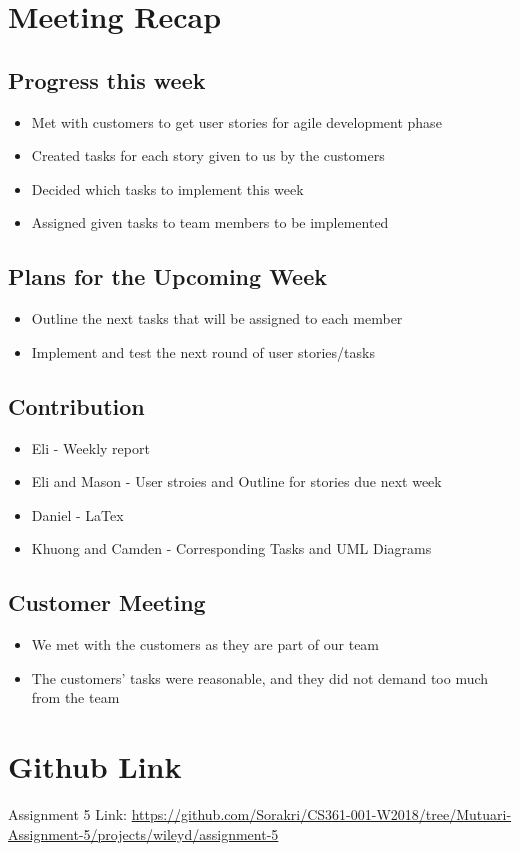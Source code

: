 \newpage
\section{Meeting Recap}
\subsection{Progress this week}
\begin{itemize}
	\item Met with customers to get user stories for agile development phase
	\item Created tasks for each story given to us by the customers
	\item Decided which tasks to implement this week
	\item Assigned given tasks to team members to be implemented
\end{itemize}

\subsection{Plans for the Upcoming Week}
\begin{itemize}
	\item Outline the next tasks that will be assigned to each member
	\item Implement and test the next round of user stories/tasks
\end{itemize}

\subsection{Contribution}
\begin{itemize}
	\item Eli - Weekly report
	\item Eli and Mason - User stroies and Outline for stories due next week
	\item Daniel - LaTex
	\item Khuong and Camden - Corresponding Tasks and UML Diagrams
\end{itemize}

\subsection{Customer Meeting}
\begin{itemize}
	\item We met with the customers as they are part of our team
	\item The customers' tasks were reasonable, and they did not demand too much from the team
\end{itemize}

\section{Github Link}
Assignment 5 Link:
\href{url}{ https://github.com/Sorakri/CS361-001-W2018/tree/Mutuari-Assignment-5/projects/wileyd/assignment-5 }